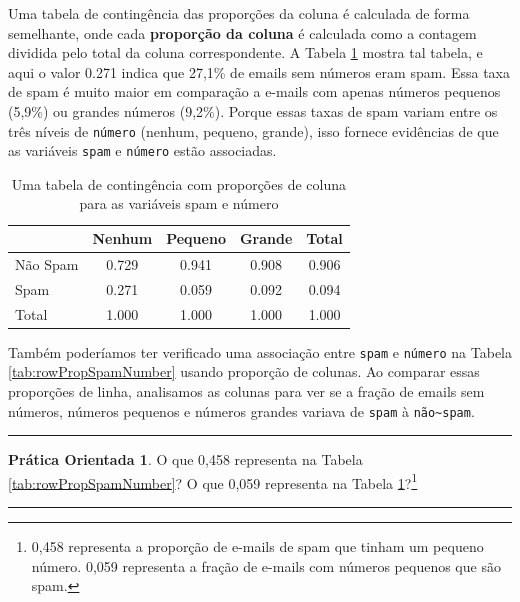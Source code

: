 \documentclass[
]{book}
\theoremstyle{definition}
\theoremstyle{definition}
\theoremstyle{definition}
\newtheorem{exercise}{Prática Orientada}[chapter]
\theoremstyle{definition}
\theoremstyle{remark}
\begin{document}
Uma tabela de contingência das proporções da coluna é calculada de forma semelhante, onde cada \textbf{proporção da coluna} é calculada como a contagem dividida pelo total da coluna correspondente. A Tabela \ref{tab:colPropSpamNumber} mostra tal tabela, e aqui o valor 0.271 indica que 27,1\% de emails sem números eram spam. Essa taxa de spam é muito maior em comparação a e-mails com apenas números pequenos (5,9\%) ou grandes números (9,2\%). Porque essas taxas de spam variam entre os três níveis de \texttt{número} (nenhum, pequeno, grande), isso fornece evidências de que as variáveis \texttt{spam} e \texttt{número} estão associadas.

\begin{table}

\caption{\label{tab:colPropSpamNumber}Uma tabela de contingência com proporções de coluna para as variáveis spam e número}
\centering
\begin{tabular}[t]{l|c|c|c|c}
\hline
  & Nenhum & Pequeno & Grande & Total\\
\hline
Não Spam & 0.729 & 0.941 & 0.908 & 0.906\\
\hline
Spam & 0.271 & 0.059 & 0.092 & 0.094\\
\hline
Total & 1.000 & 1.000 & 1.000 & 1.000\\
\hline
\end{tabular}
\end{table}

Também poderíamos ter verificado uma associação entre \texttt{spam} e \texttt{número} na Tabela \ref{tab:rowPropSpamNumber} usando proporção de colunas. Ao comparar essas proporções de linha, analisamos as colunas para ver se a fração de emails sem números, números pequenos e números grandes variava de \texttt{spam} à \texttt{não\textasciitilde{}spam}.

\begin{center}\rule{0.5\linewidth}{0.5pt}\end{center}

\begin{exercise}
\protect\hypertarget{exr:unnamed-chunk-35}{}{\label{exr:unnamed-chunk-35} }O que 0,458 representa na Tabela \ref{tab:rowPropSpamNumber}? O que 0,059 representa na Tabela \ref{tab:colPropSpamNumber}?\footnote{0,458 representa a proporção de e-mails de spam que tinham um pequeno número. 0,059 representa a fração de e-mails com números pequenos que são spam.}
\end{exercise}

\begin{center}\rule{0.5\linewidth}{0.5pt}\end{center}
\end{document}
